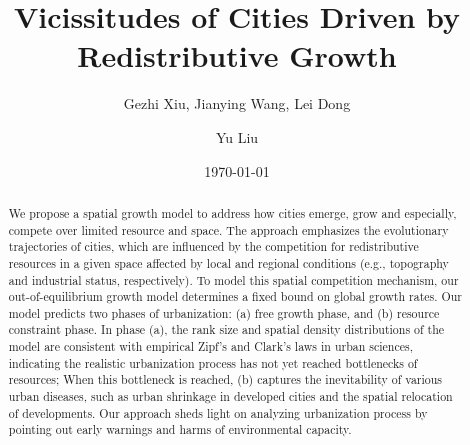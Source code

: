 \documentclass[reprint,unsortedaddress,amsmath,amssymb,aps,prl,showkeys]{revtex4-2}
\begin{document}
\title{Vicissitudes of Cities Driven by Redistributive Growth}
\author{Gezhi Xiu, Jianying Wang, Lei Dong}
\author{Yu Liu}
\date{\today}

\begin{abstract}
    We propose a spatial growth model to address how cities emerge, grow and especially, compete over limited resource and space. The approach emphasizes the evolutionary trajectories of cities, which are influenced by the competition for redistributive resources in a given space affected by local and regional conditions (e.g., topography and industrial status, respectively). To model this spatial competition mechanism, our out-of-equilibrium growth model determines a fixed bound on global growth rates. Our model predicts two phases of urbanization: (a) free growth phase, and (b) resource constraint phase. In phase (a), the rank size and spatial density distributions of the model are consistent with empirical Zipf's and Clark's laws in urban sciences, indicating the realistic urbanization process has not yet reached bottlenecks of resources; When this bottleneck is reached, (b) captures the inevitability of various urban diseases, such as urban shrinkage in developed cities and the spatial relocation of developments. Our approach sheds light on analyzing urbanization process by pointing out early warnings and harms of environmental capacity.
\end{abstract}
\maketitle
\end{document}
